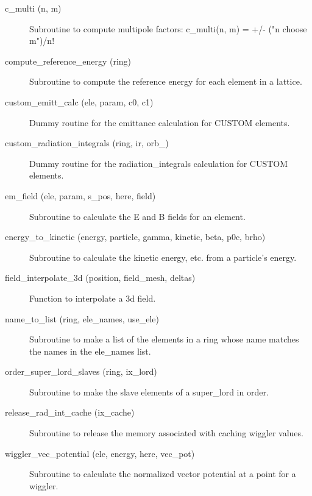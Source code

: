 \begin{description}

\item[c\_multi (n, m)] \Newline
Subroutine to compute multipole factors: 
c\_multi(n, m) = +/- ("n choose m")/n! 

\item[compute\_reference\_energy (ring)] \Newline
Subroutine to compute the reference energy for each element in a lattice. 

\item[custom\_emitt\_calc (ele, param, c0, c1)] \Newline
Dummy routine for the emittance calculation for CUSTOM elements. 

\item[custom\_radiation\_integrals (ring, ir, orb\_)] \Newline
Dummy routine for the radiation\_integrals calculation for CUSTOM elements. 

\item[em\_field (ele, param, s\_pos, here, field)] \Newline
Subroutine to calculate the E and B fields for an element. 

\item[energy\_to\_kinetic (energy, particle, gamma, kinetic, beta, p0c, brho)] \Newline
Subroutine to calculate the kinetic energy, etc. from a particle's energy. 

\item[field\_interpolate\_3d (position, field\_mesh, deltas)] \Newline
Function to interpolate a 3d field. 

\item[name\_to\_list (ring, ele\_names, use\_ele)] \Newline
Subroutine to make a list of the elements in a ring 
whose name matches the names in the ele\_names list. 

\item[order\_super\_lord\_slaves (ring, ix\_lord)] \Newline
Subroutine to make the slave elements of a super\_lord in order. 

\item[release\_rad\_int\_cache (ix\_cache)] \Newline 
     Subroutine to release the memory associated with caching wiggler values.

\item[wiggler\_vec\_potential (ele, energy, here, vec\_pot)] \Newline
Subroutine to calculate the normalized vector potential at a point for a wiggler.

\end{description}

